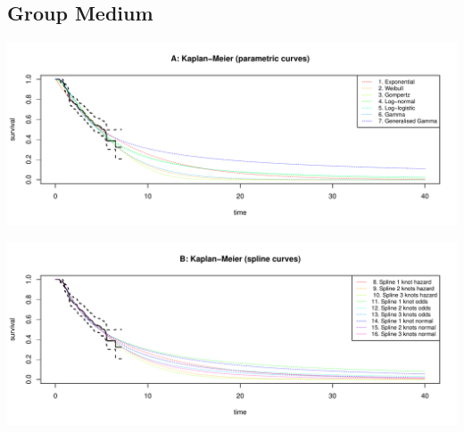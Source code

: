 \documentclass[]{article}
\begin{document}
\newpage

\subsection{Group Medium}\label{group-medium}

\begin{flushleft}\includegraphics[height=0.29\textheight]{Images/validate_extrapolation2-1} \end{flushleft}

\begin{flushleft}\includegraphics[height=0.29\textheight]{Images/validate_extrapolation2-2} \end{flushleft}
\end{document}
